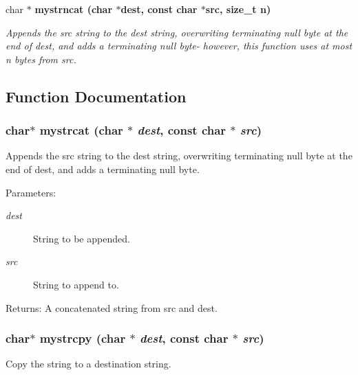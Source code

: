 \begin{CompactItemize}
char $\ast$ \bf{mystrncat} (char $\ast$dest, const char $\ast$src, size\_\-t n)
\begin{CompactList}\small\item\em Appends the src string to the dest string, overwriting terminating null byte at the end of dest, and adds a terminating null byte- however, this function uses at most n bytes from src. \item\end{CompactList}\end{CompactItemize}


\subsection{Function Documentation}
\subsubsection{\setlength{\rightskip}{0pt plus 5cm}char$\ast$ mystrcat (char $\ast$ {\em dest}, const char $\ast$ {\em src})}\label{mystring_8h_ebc286ca79fc1f0b7ca5d05066cd79a7}


Appends the src string to the dest string, overwriting terminating null byte at the end of dest, and adds a terminating null byte. 

\begin{Desc}
\item[Parameters:]
\begin{description}
\item[{\em dest}]String to be appended. \item[{\em src}]String to append to.\end{description}
\end{Desc}
\begin{Desc}
\item[Returns:]A concatenated string from src and dest. \end{Desc}
\subsubsection{\setlength{\rightskip}{0pt plus 5cm}char$\ast$ mystrcpy (char $\ast$ {\em dest}, const char $\ast$ {\em src})}\label{mystring_8h_515b2c58f31e99a4564e463ffbf73e2f}


Copy the string to a destination string. 

